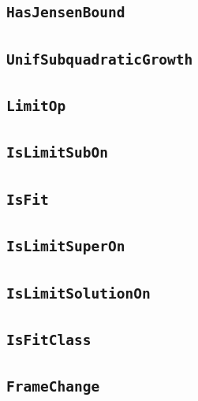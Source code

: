 \documentclass[11pt]{amsart}
\theoremstyle{definition}
\begin{document}
\subsection{\texorpdfstring{\texttt{HasJensenBound}}{HasJensenBound}}\label{node:HasJensenBound}


\subsection{\texorpdfstring{\texttt{UnifSubquadraticGrowth}}{UnifSubquadraticGrowth}}\label{node:UnifSubquadraticGrowth}


\subsection{\texorpdfstring{\texttt{LimitOp}}{LimitOp}}\label{node:LimitOp}


\subsection{\texorpdfstring{\texttt{IsLimitSubOn}}{IsLimitSubOn}}\label{node:IsLimitSubOn}


\subsection{\texorpdfstring{\texttt{IsFit}}{IsFit}}\label{node:IsFit}


\subsection{\texorpdfstring{\texttt{IsLimitSuperOn}}{IsLimitSuperOn}}\label{node:IsLimitSuperOn}


\subsection{\texorpdfstring{\texttt{IsLimitSolutionOn}}{IsLimitSolutionOn}}\label{node:IsLimitSolutionOn}


\subsection{\texorpdfstring{\texttt{IsFitClass}}{IsFitClass}}\label{node:IsFitClass}


\subsection{\texorpdfstring{\texttt{FrameChange}}{FrameChange}}\label{node:FrameChange}

\end{document}
